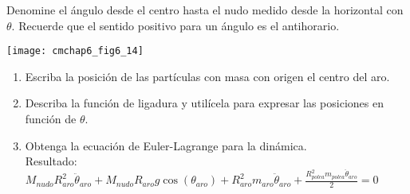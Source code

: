 \documentclass[11pt, spanish, a4paper, twoside]{article}
\begin{document}
\begin{enumerate}
\begin{minipage}[t][3.5cm]{0.8\textwidth}
		Denomine el ángulo desde el centro hasta el nudo medido desde la horizontal con \(\theta\).
		Recuerde que el sentido positivo para un ángulo es el antihorario. 
	\end{minipage}
	\begin{minipage}[c][0cm][t]{0.2\textwidth}
		\texttt{[image: cmchap6\_fig6\_14]}
	\end{minipage}
	\begin{enumerate}
		\item Escriba la posición de las partículas con masa con origen el centro del aro.
		\item Describa la función de ligadura y utilícela para expresar las posiciones en función de \(\theta\).
		\item Obtenga la ecuación de Euler-Lagrange para la dinámica.\\
		Resultado:
		\(M_{nudo} R_{aro}^{2} \ddot{\theta}_{aro} + M_{nudo} R_{aro} g \cos{\left(\theta_{aro} \right)} + R_{aro}^{2} m_{aro} \ddot{\theta}_{aro} + \frac{R_{polea}^{2} m_{polea} \ddot{\theta}_{aro}}{2} = 0\)
	\end{enumerate}



\end{enumerate}
\end{document}
